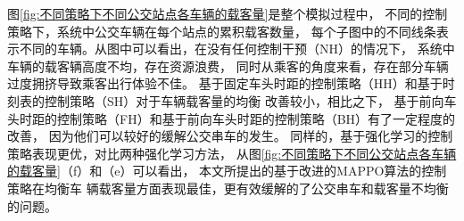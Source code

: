图\ref{fig:不同策略下不同公交站点各车辆的载客量}是整个模拟过程中，
不同的控制策略下，系统中公交车辆在每个站点的累积载客数量，
每个子图中的不同线条表示不同的车辆。从图中可以看出，在没有任何控制干预（NH）的情况下，
系统中车辆的载客辆高度不均，存在资源浪费，
同时从乘客的角度来看，存在部分车辆过度拥挤导致乘客出行体验不佳。
基于固定车头时距的控制策略（HH）和基于时刻表的控制策略（SH）对于车辆载客量的均衡
改善较小，相比之下，
基于前向车头时距的控制策略（FH）和基于前向车头时距的控制策略（BH）有了一定程度的改善，
因为他们可以较好的缓解公交串车的发生。
同样的，基于强化学习的控制策略表现更优，对比两种强化学习方法，
从图\ref{fig:不同策略下不同公交站点各车辆的载客量}（f）和（e）可以看出，
本文所提出的基于改进的MAPPO算法的控制策略在均衡车
辆载客量方面表现最佳，更有效缓解的了公交串车和载客量不均衡的问题。





